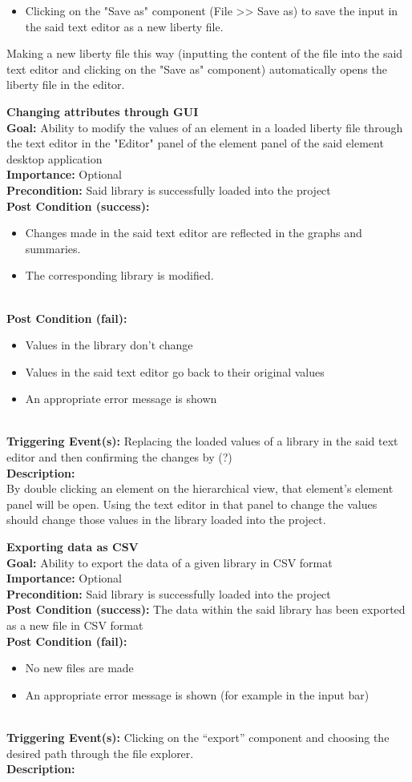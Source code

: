 \documentclass[10pt,a4paper]{report}
\newcommand{\precondition}[1]{
    \textbf{Precondition: } #1 \leavevmode \\
}
\newcommand{\FRODescription}[8]{
    \textbf{#1} \leavevmode \\
    \textbf{Goal: } #2 \leavevmode \\
    \textbf{Importance: } #3 \leavevmode \\
    \precondition{#4}
    \textbf{Post Condition (success): } #5 \leavevmode \\
    \textbf{Post Condition (fail): } #6 \leavevmode \\
    \textbf{Triggering Event(s): } #7 \leavevmode \\
    \textbf{Description: } \leavevmode \\
    #8}
\begin{document}
\begin{FRO}
{\begin{itemize}
        \item Clicking on the "Save as" component (File >> Save as) to save the input in the said text editor as a new liberty file.
    \end{itemize}}
    {Making a new liberty file this way (inputting the content of the file into the said text editor and clicking on the "Save as" component) automatically opens the liberty file in the editor.}
    \item \FRODescription{Changing attributes through GUI}
    {Ability to modify the values of an element in a loaded liberty file through the text editor in the "Editor" panel of the element panel of the said element desktop application}
    {Optional}
    {Said library is successfully loaded into the project}
    {\begin{itemize}
        \item Changes made in the said text editor are reflected in the graphs and summaries.
        \item The corresponding library is modified.
    \end{itemize}}
    {\begin{itemize}
        \item Values in the library don’t change
        \item Values in the said text editor go back to their original values
        \item An appropriate error message is shown
    \end{itemize}}
    {Replacing the loaded values of a library in the said text editor and then confirming the changes by (?)}
    {By double clicking an element on the hierarchical view, that element's element panel will be open. Using the text editor in that panel to change the values should change those values in the library loaded into the project.}
    \item \FRODescription{Exporting data as CSV}
    {Ability to export the data of a given library in CSV format}
    {Optional}
    {Said library is successfully loaded into the project}
    {The data within the said library has been exported as a new file in CSV format}
    {\begin{itemize}
        \item No new files are made
        \item An appropriate error message is shown (for example in the input bar)
    \end{itemize}}
    {Clicking on the “export” component and choosing the desired path through the file explorer.}

\end{FRO}
\end{document}
